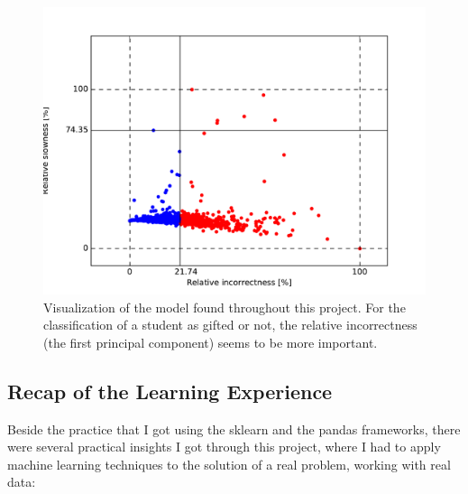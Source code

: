  \begin{figure}
 	\centering
 	\includegraphics[width=.8\textwidth]{./img/explViz.pdf}
 	\caption{Visualization of the model found throughout this project. For the classification of a student as gifted or not, the relative incorrectness (the first principal component) seems to be more important. \label{fig_expl_viz}}
 \end{figure}

\subsection{Recap of the Learning Experience}
Beside the practice that I got using the sklearn and the pandas frameworks, there were several practical insights I got through this project, where I had to apply machine learning techniques to the solution of a real problem, working with real data:

